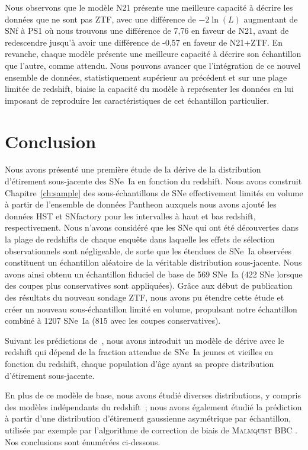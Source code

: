 \documentclass[../main/main.tex]{subfiles}
\begin{document}
Nous observons que le modèle N21 présente une meilleure capacité à décrire les
données que ne sont pas ZTF, avec une différence de $-2\ln(L)$ augmentant de SNf
à PS1 où nous trouvons une différence de 7,76 en faveur de N21, avant de
redescendre jusqu'à avoir une différence de -0,57 en faveur de N21+ZTF. En
revanche, chaque modèle présente une meilleure capacité à décrire son
échantillon que l'autre, comme attendu. Nous pouvons avancer que l'intégration
de ce nouvel ensemble de données, statistiquement supérieur au précédent et sur
une plage limitée de redshift, biaise la capacité du modèle à représenter les
données en lui imposant de reproduire les caractéristiques de cet échantillon
particulier.

\section{Conclusion}\label{ssec:xccl}

Nous avons présenté une première étude de la dérive de la distribution
d'étirement sous-jacente des SNe~Ia en fonction du redshift. Nous avons
construit Chapitre~\ref{ch:sample} des sous-échantillons de SNe effectivement
limités en volume à partir de l'ensemble de données Pantheon \citep[][SDSS, PS1,
SNLS]{scolnic2018} auxquels nous avons ajouté les données HST et SNfactory
\citep{rigault2020} pour les intervalles à haut et bas redshift, respectivement.
Nous n'avons considéré que les SNe qui ont été découvertes dans la plage de
redshifts de chaque enquête dans laquelle les effets de sélection
observationnels sont négligeable, de sorte que les étendues de SNe~Ia observées
constituent un échantillon aléatoire de la véritable distribution sous-jacente.
Nous avons ainsi obtenu un échantillon fiduciel de base de 569 SNe~Ia (422 SNe
lorsque des coupes plus conservatives sont appliquées). Grâce aux début de
publication des résultats du nouveau sondage ZTF, nous avons pu étendre cette
étude et créer un nouveau sous-échantillon limité en volume, propulsant notre
échantillon combiné à 1207 SNe~Ia (815 avec les coupes conservatives).

Suivant les prédictions de~\cite{rigault2020}, nous avons introduit un modèle de
dérive avec le redshift qui dépend de la fraction attendue de SNe~Ia
jeunes et vieilles en fonction du redshift, chaque population d'âge ayant sa
propre distribution d'étirement sous-jacente.

En plus de ce modèle de base, nous avons étudié diverses distributions, y
compris des modèles indépendants du redshift~; nous avons également étudié la
prédiction à partir d'une distribution d'étirement gaussienne asymétrique par
échantillon, utilisée par exemple par l'algorithme de correction de biais de
\textsc{Malmquist} BBC \citep{scolnic2016, kessler2017}. Nos conclusions sont
énumérées ci-dessous.
\end{document}
